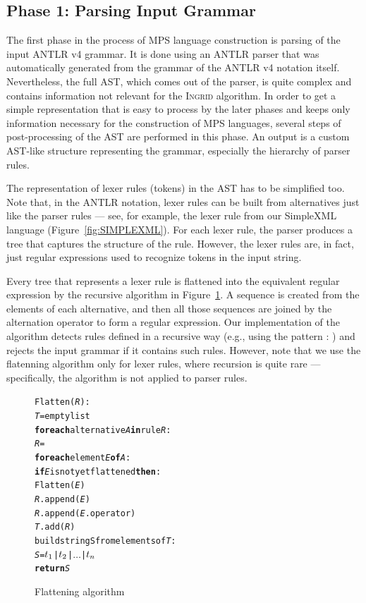 \subsection{Phase 1: Parsing Input Grammar}

The first phase in the process of MPS language construction is parsing of the input ANTLR v4 grammar.
It is done using an ANTLR parser that was automatically generated from the grammar of the ANTLR v4 notation itself.
Nevertheless, the full AST, which comes out of the parser, is quite complex and contains information not relevant for the \textsc{Ingrid} algorithm.
In order to get a simple representation that is easy to process by the later phases and keeps only information necessary for the construction of MPS languages, several steps of post-processing of the AST are performed in this phase.
An output is a custom AST-like structure representing the grammar, especially the hierarchy of parser rules.

The representation of lexer rules (tokens) in the AST has to be simplified too.
Note that, in the ANTLR notation, lexer rules can be built from alternatives just like the parser rules --- see, for example, the lexer rule  from our SimpleXML language (Figure~\ref{fig:SIMPLEXML}).
For each lexer rule, the parser produces a tree that captures the structure of the rule.
However, the lexer rules are, in fact, just regular expressions used to recognize tokens in the input string.

Every tree that represents a lexer rule is flattened into the equivalent regular expression by the recursive algorithm in Figure~\ref{fig:ALGFLATTEN}.
A sequence is created from the elements of each alternative, and then all those sequences are joined by the alternation operator \code{$|$} to form a regular expression.
Our implementation of the algorithm detects rules defined in a recursive way (e.g., using the pattern  :  ) and rejects the input grammar if it contains such rules.
However, note that we use the flatenning algorithm only for lexer rules, where recursion is quite rare --- specifically, the algorithm is not applied to parser rules.

\begin{figure}[ht]
\centering
\begin{framed}
\begin{alltt}
\small
Flatten(\textit{R}):
  \textit{T} = empty list
  \textbf{for each} alternative \textit{A} \textbf{in} rule \textit{R}:
    \textit{R} = \antlrap\antlrap
    \textbf{for each} element \textit{E} \textbf{of} \textit{A}:
      \textbf{if} \textit{E} is not yet flattened \textbf{then}:
        Flatten(\textit{E})
      \textit{R}.append(\textit{E})
      \textit{R}.append(\textit{E}.operator)
    \textit{T}.add(\textit{R})
  build string S from elements of \textit{T}:
    \textit{S} = \(t\sb{1}\) | \(t\sb{2}\) | \(\ldots\) | \(t\sb{n}\)
  \textbf{return} \textit{S}
\end{alltt}
\end{framed}
\caption{Flattening algorithm}
\label{fig:ALGFLATTEN}
\end{figure}

